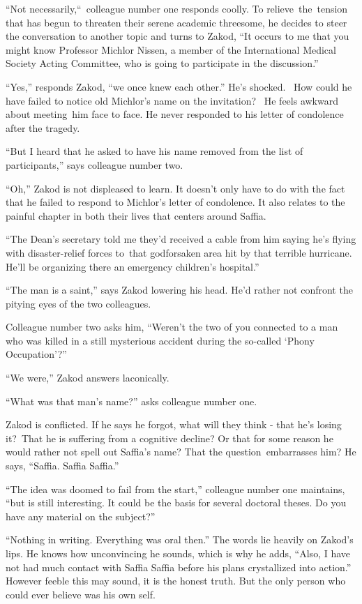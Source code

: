 \documentclass[twoside,11pt]{book}
\begin{document}
``Not necessarily,``\ colleague number one responds coolly. To relieve~the~tension that has
begun to threaten their serene academic threesome, he decides to steer the conversation to another topic and turns to
Zakod, ``It occurs to me that you might know Professor Michlor Nissen, a member of the International
Medical Society Acting Committee, who is going to participate in the discussion.'' 

``Yes,'' responds Zakod, ``we once knew each other.'' He's shocked.
~How could he have failed to notice old Michlor's name on the invitation? ~He feels awkward about meeting\  him face to
face. He never responded to his letter of condolence after the tragedy.\ \ 

``But I heard that he asked to have his name removed from the list of participants,'' says
colleague number two. 

``Oh,'' Zakod is not displeased to learn. It doesn't only have to do with the fact that he
failed to respond to Michlor's letter of condolence. It also relates to the painful chapter in both their lives that
centers around Saffia.

``The Dean's secretary told me they'd received a cable from him saying he's flying with disaster-relief
forces to{\ }that godforsaken area hit by that terrible hurricane. He'll be organizing there an
emergency children's hospital.'' 

``The man is a saint,'' says Zakod lowering his head. He'd rather not confront the pitying
eyes of the two colleagues. 

Colleague number two asks him, ``Weren't the two of you connected to a man who was killed in a still
mysterious accident during the so-called `Phony Occupation'?'' 

``We were,'' Zakod answers laconically. 

``What was that man's name?'' asks colleague number one.

Zakod is conflicted. If he says he forgot, what will they think - that he's losing it?{\ }That he is
suffering from a cognitive decline? Or that for some reason he would rather not spell out Saffia's name? That the
question~embarrasses him? He says, ``Saffia. Saffia Saffia.'' 

``The idea was doomed to fail from the start,'' colleague number one maintains, ``but is still
interesting. It could be the basis for several doctoral theses. Do you have any material on the subject?''


``Nothing in writing. Everything was oral then.'' The words lie heavily on Zakod's lips. He
knows how unconvincing he sounds, which is why he adds, ``Also, I have not had much contact with Saffia
Saffia before his plans crystallized into action.'' However feeble this may sound, it is the honest truth.
But the only person who could ever believe was his own self.\ 
\end{document}
